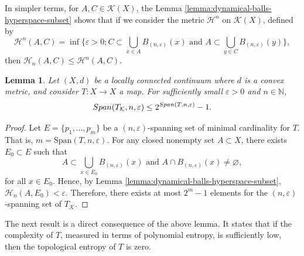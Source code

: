 \documentclass[sn-mathphys-num]{sn-jnl}%
\theoremstyle{thmstyleone}%
\newtheorem{lemma}{Lemma}
\theoremstyle{thmstyletwo}%
\theoremstyle{thmstylethree}%
\newcommand*\induce[1]{#1_\mathcal{K}}
\newcommand*\hyp[1]{\mathcal{#1}}
\begin{document}
In simpler terms, for $A, C \in \hyp{K}(X)$, the Lemma \ref{lemma:dynamical-balls-hyperspace-subset} shows that if we consider the metric $\mathcal{H}^n$ on $\hyp{K}(X)$, defined by 
\begin{equation*}
    \mathcal{H}^n(A, C) = \inf\{\varepsilon > 0; C \subset \bigcup\limits_{x \in A} B_{(n, \varepsilon)}(x) \text{ and } A \subset \bigcup\limits_{y \in C} B_{(n, \varepsilon)}(y) \},
\end{equation*}
then $\mathcal{H}_n(A, C) \leq \mathcal{H}^n(A, C)$.\\


\begin{lemma}\label{lemma:span-hyperspace-bounded-exponential-span-base}
    Let $(X, d)$ be a locally connected continuum where $d$ is a convex metric, and consider $T: X \to X$ a map. For sufficiently small $\varepsilon > 0$ and $n \in \mathbb{N}$,
    \begin{equation*}
        \emph{Span}(\induce{T}, n, \varepsilon) \leq 2^{\emph{Span}(T, n, \varepsilon)} - 1.
    \end{equation*}
\end{lemma}
\begin{proof}
    Let $E = \{p_1, ..., p_m\}$ be a $(n, \varepsilon)$-spanning set of minimal cardinality for $T$. That is, $m = \text{Span}(T, n, \varepsilon)$. For any closed nonempty set $A \subset X$, there exists $E_0 \subset E$ such that 
    \begin{equation*}
        A \subset \bigcup\limits_{x \in E_0} B_{(n, \varepsilon)}(x) \text{ and } A \cap B_{(n, \varepsilon)}(x) \neq \varnothing,
    \end{equation*}
    for all $x \in E_0$. Hence, by Lemma \ref{lemma:dynamical-balls-hyperspace-subset}, $\mathcal{H}_n(A, E_0) < \varepsilon$. Therefore, there exists at most $2^m - 1$ elements for the $(n, \varepsilon)$-spanning set of $\induce{T}$. 
\end{proof}

The next result is a direct consequence of the above lemma. It states that if the complexity of $T$, measured in terms of polynomial entropy, is sufficiently low, then the topological entropy of $T$ is zero.\\
\end{document}
